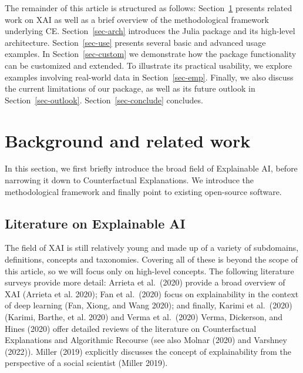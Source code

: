 \documentclass{juliacon}
\begin{document}
The remainder of this article is structured as follows:
Section~\ref{sec-related} presents related work on XAI as well as a
brief overview of the methodological framework underlying CE.
Section~\ref{sec-arch} introduces the Julia package and its high-level
architecture. Section~\ref{sec-use} presents several basic and advanced
usage examples. In Section~\ref{sec-custom} we demonstrate how the
package functionality can be customized and extended. To illustrate its
practical usability, we explore examples involving real-world data in
Section~\ref{sec-emp}. Finally, we also discuss the current limitations
of our package, as well as its future outlook in
Section~\ref{sec-outlook}. Section~\ref{sec-conclude} concludes.

\section{Background and related work}\label{sec-related}

In this section, we first briefly introduce the broad field of
Explainable AI, before narrowing it down to Counterfactual Explanations.
We introduce the methodological framework and finally point to existing
open-source software.

\subsection{Literature on Explainable
AI}\label{literature-on-explainable-ai}

The field of XAI is still relatively young and made up of a variety of
subdomains, definitions, concepts and taxonomies. Covering all of these
is beyond the scope of this article, so we will focus only on high-level
concepts. The following literature surveys provide more detail: Arrieta
et al.~(2020) provide a broad overview of XAI (Arrieta et al. 2020); Fan
et al.~(2020) focus on explainability in the context of deep learning
(Fan, Xiong, and Wang 2020); and finally, Karimi et al.~(2020) (Karimi,
Barthe, et al. 2020) and Verma et al.~(2020) Verma, Dickerson, and Hines
(2020) offer detailed reviews of the literature on Counterfactual
Explanations and Algorithmic Recourse (see also Molnar (2020) and
Varshney (2022)). Miller (2019) explicitly discusses the concept of
explainability from the perspective of a social scientist (Miller 2019).
\end{document}
